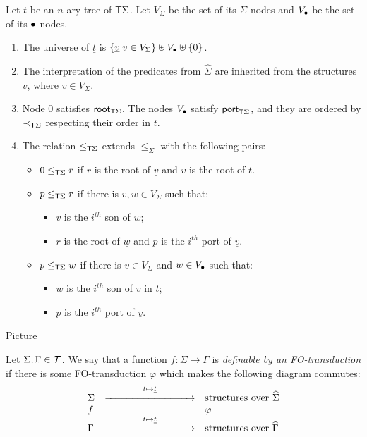 \begin{itemize}
 Let $t$ be an $n$-ary tree of $\mathsf T \Sigma$. Let $V_\Sigma$ be  the set of its $\Sigma$-nodes and $V_\bullet$ be the set of its $\bullet$-nodes. 
\begin{enumerate}
\item The universe of $\underline{t}$ is $\{\underline{v}| v\in V_\Sigma\}\uplus V_\bullet\uplus\{0\}$.
\item The interpretation of the predicates from $\widehat \Sigma$ are inherited from the structures $\underline{v}$, where $v\in V_\Sigma$.
\item Node $0$ satisfies $\mathsf{root}_{\mathsf T\Sigma}$. The nodes $V_\bullet$ satisfy $\mathsf{port}_{\mathsf T\Sigma}$, and they are ordered by $\prec_{\mathsf T\Sigma}$ respecting their order in $t$. 
\item The relation $\leq_{\mathsf T\Sigma}$ extends $\leq_\Sigma$ with the following pairs:      
\begin{itemize}
\item $0\leq_{\mathsf T\Sigma} r$ if $r$ is the root of $\underline{v}$ and $v$ is the root of $t$.
\item $ p\leq_{\mathsf T\Sigma} r$ if there is $v,w \in V_\Sigma$ such that:
\begin{itemize}
\item $v$ is the $i^{th}$ son of $w$; 
\item $r$ is the root of $\underline{w}$ and $p$ is the $i^{th}$ port of $\underline{v}$.
\end{itemize}
\item $p\leq_{\mathsf T\Sigma} w$ if there is $v\in V_\Sigma$ and $w\in V_\bullet$ such that:
\begin{itemize}
\item $w$ is the $i^{th}$ son of $v$ in $t$;
\item $p$ is the $i^{th}$ port of $\underline{v}$.
\end{itemize}
\end{itemize}
\end{enumerate}
\begin{center}
Picture
\end{center}
 \end{itemize}  

\begin{definition} Let $\Sigma, \Gamma\in {\mathcal T}$. We say that a function $f:\Sigma\to \Gamma$ is \emph{definable by an FO-transduction} if there is some FO-transduction $\varphi$ which makes the following diagram commutes:
\[\begin{array}{lll}
\Sigma& \stackrel{t\mapsto \underline{t}}{\xrightarrow{\hspace*{3cm}}} & \text{structures over }\widehat \Sigma \\
f&&\varphi\\
\Gamma& \stackrel{t\mapsto \underline{t}}{\xrightarrow{\hspace*{3cm}}}  & \text{structures over }\widehat \Gamma 
\end{array}\]
\end{definition}

